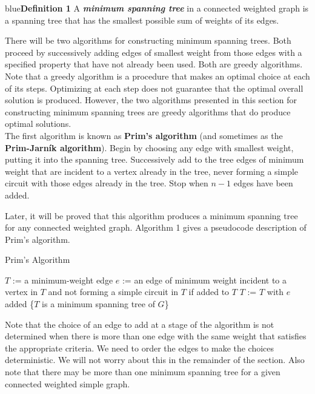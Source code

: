 \documentclass{article}
\newenvironment{definition}[1]{\begin{mybox}{blue}{\textbf{Definition #1}}}{\end{mybox}}
\begin{document}
\begin{definition}
{1}
A \textit{\textbf{minimum spanning tree}} in a connected weighted graph is a spanning tree that has the smallest possible sum of weights of its edges.
\end{definition}

There will be two algorithms for constructing minimum spanning trees. Both proceed by successively adding edges of smallest weight from those edges with a specified property that have not already been used. Both are greedy algorithms. Note that a greedy algorithm is a procedure that makes an optimal choice at each of its steps. Optimizing at each step does not guarantee that the optimal overall solution is produced. However, the two algorithms presented in this section for constructing minimum spanning trees are greedy algorithms that do produce optimal solutions.\\

The first algorithm is known as \textbf{Prim’s algorithm} (and sometimes as the \textbf{Prim-Jarník algorithm}). Begin by choosing any edge with smallest weight, putting it into the spanning tree. Successively add to the tree edges of minimum weight that are incident to a vertex already in the tree, never forming a simple circuit with those edges already in the tree. Stop when $n - 1$ edges have been added.

Later, it will be proved that this algorithm produces a minimum spanning tree for any connected weighted graph. Algorithm 1 gives a pseudocode description of Prim’s algorithm.

\begin{algorithm}
\caption{Prim’s Algorithm}
\begin{algorithmic}
\State $T$ := a minimum-weight edge
\State $e$ := an edge of minimum weight incident to a vertex in $T$ and not forming a simple circuit in $T$ if added to $T$
\State $T$ := $T$ with $e$ added
\EndFor
\State {} \{$T$ is a minimum spanning tree of $G$\}
\EndProcedure
\end{algorithmic}
\end{algorithm}

Note that the choice of an edge to add at a stage of the algorithm is not determined when there is more than one edge with the same weight that satisfies the appropriate criteria. We need to order the edges to make the choices deterministic. We will not worry about this in the remainder of the section. Also note that there may be more than one minimum spanning tree for a given connected weighted simple graph.
\end{document}
